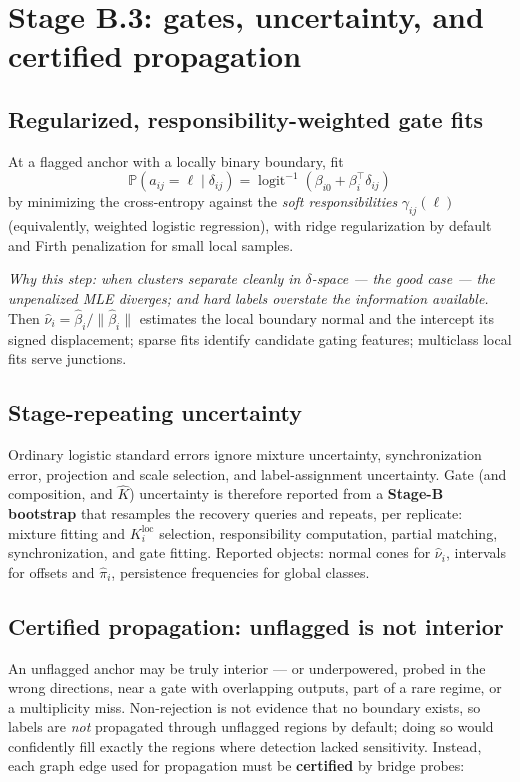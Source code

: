 \documentclass[11pt]{article}
\newcommand{\Prob}{\mathbb{P}}
\newcommand{\why}[1]{\par\noindent\textcolor{muted}{\small\itshape Why this step: #1}}
\begin{document}
\section{Stage B.3: gates, uncertainty, and certified propagation}

\subsection{Regularized, responsibility-weighted gate fits}
\label{sec:gate}

At a flagged anchor with a locally binary boundary, fit
\[
  \Prob(a_{ij}=\ell\mid\delta_{ij})
  =\operatorname{logit}^{-1}(\beta_{i0}+\beta_i^\top\delta_{ij})
\]
by minimizing the cross-entropy against the \emph{soft responsibilities}
\(\gamma_{ij}(\ell)\) (equivalently, weighted logistic regression), with ridge
regularization by default and Firth penalization for small local samples.
\why{when clusters separate cleanly in \(\delta\)-space --- the good case --- the unpenalized
MLE diverges; and hard labels overstate the information available.}
Then \(\widehat\nu_i=\widehat\beta_i/\|\widehat\beta_i\|\) estimates the local boundary
normal and the intercept its signed displacement; sparse fits identify candidate gating
features; multiclass local fits serve junctions.

\subsection{Stage-repeating uncertainty}
\label{sec:gateuq}

Ordinary logistic standard errors ignore mixture uncertainty, synchronization error,
projection and scale selection, and label-assignment uncertainty. Gate (and composition, and
\(\widehat K\)) uncertainty is therefore reported from a \textbf{Stage-B bootstrap} that
resamples the recovery queries and repeats, per replicate: mixture fitting and
\(K_i^{\mathrm{loc}}\) selection, responsibility computation, partial matching,
synchronization, and gate fitting. Reported objects: normal cones for
\(\widehat\nu_i\), intervals for offsets and \(\widehat\pi_i\), persistence frequencies for
global classes.

\subsection{Certified propagation: unflagged is not interior}
\label{sec:certify}

An unflagged anchor may be truly interior --- or underpowered, probed in the wrong
directions, near a gate with overlapping outputs, part of a rare regime, or a multiplicity
miss. Non-rejection is not evidence that no boundary exists, so labels are \emph{not}
propagated through unflagged regions by default; doing so would confidently fill exactly the
regions where detection lacked sensitivity. Instead, each graph edge used for propagation
must be \textbf{certified} by bridge probes:
\end{document}
